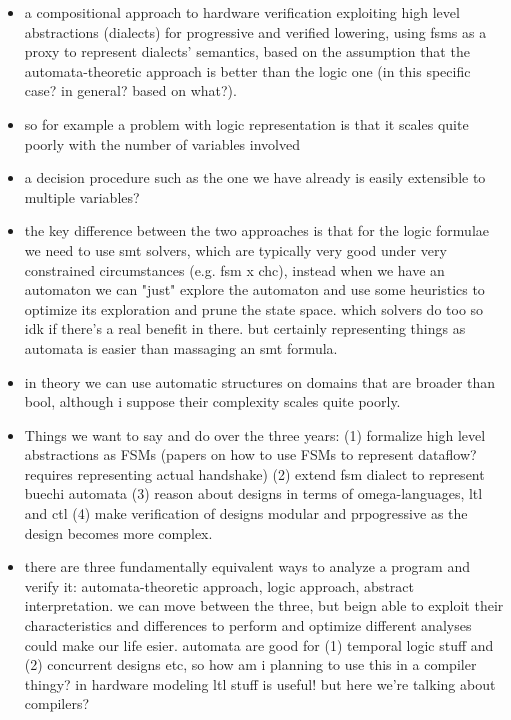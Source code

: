 \documentclass[]{article}
\begin{document}
\begin{itemize}
    \item a compositional approach to hardware verification exploiting high level abstractions (dialects)
        for progressive and verified lowering, using fsms as a proxy to represent dialects' semantics, 
        based on the assumption that the automata-theoretic approach is better than the logic one (in this specific case? in general? based on what?).
    \item so for example a problem with logic representation is that it scales quite poorly with the number of variables involved
    \item a decision procedure such as the one we have already is easily extensible to multiple variables? 
    \item the key difference between the two approaches is that for the logic formulae we need to use smt solvers, which are typically very good under 
        very constrained circumstances (e.g. fsm x chc), instead when we have an automaton we can "just" explore the automaton and use some 
        heuristics to optimize its exploration and prune the state space. which solvers do too so idk if there's a real benefit in there. 
        but certainly representing things as automata is easier than massaging an smt formula. 
    \item in theory we can use automatic structures on domains that are broader than bool, although i suppose their complexity scales quite poorly. 
    \item Things we want to say and do over the three years: 
        (1) formalize high level abstractions as FSMs (papers on how to use FSMs to represent dataflow? requires representing actual handshake)
        (2) extend fsm dialect to represent buechi automata 
        (3) reason about designs in terms of omega-languages, ltl and ctl
        (4) make verification of designs modular and prpogressive as the design becomes more complex.
    \item there are three fundamentally equivalent ways to analyze a program and verify it: automata-theoretic approach, logic approach, abstract interpretation. 
        we can move between the three, but beign able to exploit their characteristics and differences to perform and optimize different analyses could make our life esier. 
        automata are good for (1) temporal logic stuff and (2) concurrent designs etc, so how am i planning to use this in a compiler thingy? 
        in hardware modeling ltl stuff is useful! but here we're talking about compilers? 

\end{itemize}
\end{document}
